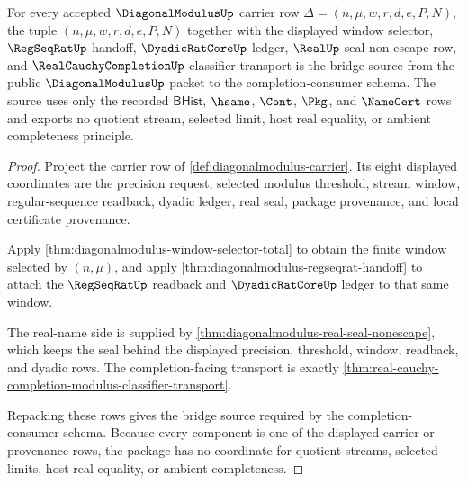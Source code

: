 \begin{theorem}
\label{thm:diagonalmodulus-bridge-source-package}
For every accepted $\DiagonalModulusUp$ carrier row $\Delta=(n,\mu,w,r,d,e,P,N)$, the tuple $(n,\mu,w,r,d,e,P,N)$ together with the displayed window selector, $\RegSeqRatUp$ handoff, $\DyadicRatCoreUp$ ledger, $\RealUp$ seal non-escape row, and $\RealCauchyCompletionUp$ classifier transport is the bridge source from the public $\DiagonalModulusUp$ packet to the completion-consumer schema. The source uses only the recorded $\mathsf{BHist}$, $\hsame$, $\Cont$, $\Pkg$, and $\NameCert$ rows and exports no quotient stream, selected limit, host real equality, or ambient completeness principle.
\end{theorem}
\begin{proof}
Project the carrier row of \autoref{def:diagonalmodulus-carrier}. Its eight displayed coordinates are the precision request, selected modulus threshold, stream window, regular-sequence readback, dyadic ledger, real seal, package provenance, and local certificate provenance.

Apply \autoref{thm:diagonalmodulus-window-selector-total} to obtain the finite window selected by $(n,\mu)$, and apply \autoref{thm:diagonalmodulus-regseqrat-handoff} to attach the $\RegSeqRatUp$ readback and $\DyadicRatCoreUp$ ledger to that same window.

The real-name side is supplied by \autoref{thm:diagonalmodulus-real-seal-nonescape}, which keeps the seal behind the displayed precision, threshold, window, readback, and dyadic rows. The completion-facing transport is exactly \autoref{thm:real-cauchy-completion-modulus-classifier-transport}.

Repacking these rows gives the bridge source required by the completion-consumer schema. Because every component is one of the displayed carrier or provenance rows, the package has no coordinate for quotient streams, selected limits, host real equality, or ambient completeness.
\end{proof}

